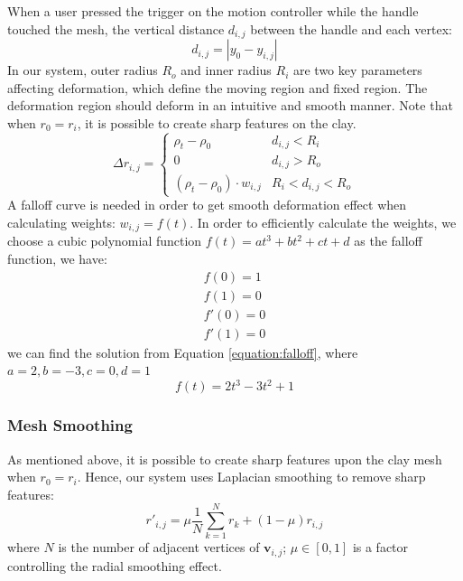When a user pressed the trigger on the motion controller while the handle touched the mesh, the vertical distance $d_{i,j}$ between the handle and each vertex:
\begin{equation}
d_{i,j} = |y_{0} - y_{i,j}|
\end{equation}
In our system, outer radius $R_{o}$ and inner radius $R_{i}$ are two key parameters affecting deformation, which define the moving region and fixed region. The deformation region should deform in an intuitive and smooth manner. Note that when $r_{0} = r_{i}$, it is possible to create sharp features on the clay.
\begin{equation}
\Delta r_{i,j} = \begin{cases}
\rho_{t} - \rho_{0} &  d_{i,j} < R_{i} \\
0 &  d_{i,j} > R_{o} \\
(\rho_{t} - \rho_{0}) \cdot w_{i,j} &  R_{i} < d_{i,j} < R_{o}
\end{cases}
\end{equation}
A falloff curve is needed in order to get smooth deformation effect when calculating weights: $w_{i,j} = f(t)$. In order to efficiently calculate the weights, we choose a cubic polynomial function $f(t) = at^3 + bt^2 + ct + d$ as the falloff function, we have:
\begin{equation}
\begin{aligned}
\label{equation:falloff}
f(0) = 1 \\
f(1) = 0 \\ 
f'(0) = 0 \\
f'(1) = 0
\end{aligned}
\end{equation}
we can find the solution from Equation \ref{equation:falloff}, where 
$a = 2, b = -3, c = 0, d = 1$
\begin{equation}
f(t) = 2t^3 - 3t^2 + 1
\end{equation}

\subsubsection{Mesh Smoothing}
\label{sec:4.2.4}
As mentioned above, it is possible to create sharp features upon the clay mesh when $r_{0} = r_{i}$. Hence, our system uses Laplacian smoothing to remove sharp features: 
\begin{equation}
r'_{i,j} = 
\mu  \frac{1}{N} 
\sum_{k=1}^N r_{k}
+ (1 - \mu)  r_{i,j}
\end{equation}
where $N$ is the number of adjacent vertices of $\mathbf{v}_{i,j}$; $\mu \in [0,1]$ is a factor controlling the radial smoothing effect.

